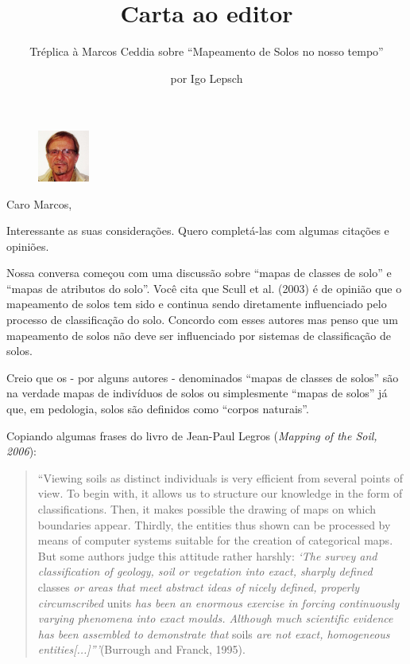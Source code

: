 \title{Carta ao editor}
\subtitle{Tréplica à Marcos Ceddia sobre ``Mapeamento de Solos no nosso tempo''}
\author{por Igo Lepsch}
\maketitle

\begin{figure}
\includegraphics[width=0.15\textwidth]{figuras/igo}
\end{figure}

Caro Marcos,

Interessante as suas considerações. Quero completá-las com algumas citações e opiniões.

Nossa conversa começou com uma discussão sobre ``mapas de classes de solo'' e ``mapas de atributos do solo''. Você cita que Scull et al. (2003) é de opinião que o mapeamento de solos tem sido e continua sendo diretamente influenciado pelo processo de classificação do solo. Concordo com esses autores mas penso que um mapeamento de solos não deve ser influenciado por sistemas de classificação de solos.

Creio que os - por alguns autores - denominados ``mapas de classes de solos'' são na verdade mapas de indivíduos de solos ou simplesmente ``mapas de solos'' já que, em pedologia, solos são definidos como ``corpos naturais''.

Copiando algumas frases do livro de Jean-Paul Legros (\textit{Mapping of the Soil, 2006}):

\begin{quotation}
  ``Viewing soils as distinct individuals is very efficient from several points of view. To begin with, it allows us to structure our knowledge in the form of classifications. Then, it makes possible the drawing of maps on which boundaries appear. Thirdly, the entities thus shown can be processed by means of computer systems suitable for the creation of categorical maps. But some authors judge this attitude rather harshly: \textit{`The survey and classification of geology, soil or vegetation into exact, sharply defined} classes \textit{or areas that meet abstract ideas of nicely defined, properly circumscribed} units \textit{has been an enormous exercise in forcing continuously varying phenomena into exact moulds. Although much scientific evidence has been assembled to demonstrate that} soils \textit{are not exact, homogeneous entities[...]'''}(Burrough and Franck, 1995).
\end{quotation}

